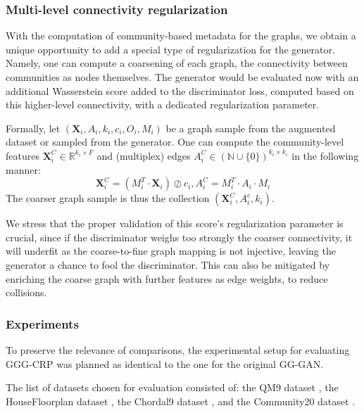 \subsubsection{Multi-level connectivity regularization}
With the computation of community-based metadata for the graphs, we obtain a unique opportunity to add a special type of regularization for the generator. Namely, one can compute a coarsening of each graph, the connectivity between communities as nodes themselves. The generator would be evaluated now with an additional Wasserstein score added to the discriminator loss, computed based on this higher-level connectivity, with a dedicated regularization parameter. 

Formally, let $(\mathbf{X}_i, A_i, k_i, c_i, O_i, M_i)$ be a graph sample from the augmented dataset or sampled from the generator. One can compute the community-level features $\mathbf{X}^C_i \in \mathbb{R}^{k_i \times F}$ and (multiplex) edges $A^C_i \in (\mathbb{N} \cup \{0\})^{k_i \times k_i}$ in the following manner: $$\mathbf{X}^C_i = (M^T_i \cdot \mathbf{X}_i) \oslash c_i, A^C_i = M^T_i \cdot A_i \cdot M_i$$
The coarser graph sample is thus the collection $(\mathbf{X}^C_i, A^c_i, k_i)$.

We stress that the proper validation of this score's regularization parameter is crucial, since if the discriminator weighs too strongly the coarser connectivity, it will underfit as the coarse-to-fine graph mapping is not injective, leaving the generator a chance to fool the discriminator. This can also be mitigated by enriching the coarse graph with further features as edge weights, to reduce collisions.


\subsubsection{Experiments}

To preserve the relevance of comparisons, the experimental setup for evaluating GGG-CRP was planned as identical to the one for the original GG-GAN.

The list of datasets chosen for evaluation consisted of: the QM9 dataset \cite{de_cao_molgan_2018}, the HouseFloorplan dataset \cite{nauata_house-gan_2020}, the Chordal9 dataset \cite{mckay_chordal_2020}, and the Community20 dataset \cite{niu_permutation_2020}.

